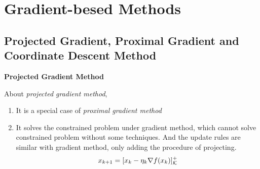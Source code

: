 \ifx\allfiles\undefined


	\else
	\fi
	\chapter{Gradient-besed Methods}
	\section{Projected Gradient, Proximal Gradient and Coordinate Descent Method}
	
	\textbf{Projected Gradient Method}
	
	About \emph{projected gradient method},
	\begin{enumerate}
		\item It is a special case of \emph{proximal gradient method}
		\item It solves the constrained problem under gradient method, which cannot solve constrained problem without some techniques. And the update rules are similar with gradient method, only adding the procedure of projecting.
		$$
		x_{k+1} = [x_k-\eta_k\nabla f(x_k)]^{+}_{\mathcal{K}}
		$$
	\end{enumerate}
	
